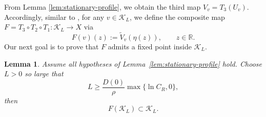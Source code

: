 \documentclass[preprint,sort&compress,final,12pt]{elsarticle}
\newtheorem{lemma}[theorem]{Lemma}
\numberwithin{equation}{section}
\begin{document}
From Lemma \ref{lem:stationary-profile}, we obtain the third map $V_v=T_3(U_v)$. Accordingly, similar to \cite{ChenQi2025}, for any $v\in\mathcal K_L$, we define the composite map $F = T_3\circ T_2\circ T_1:\mathcal K_L\to X$ via
\begin{equation*}
F(v)(z):=\widetilde V_v(\eta(z)),\qquad z\in\mathbb R.
\end{equation*}
Our next goal is to prove that $F$ admits a fixed point inside $\mathcal K_L$.

\begin{lemma}\label{lem:F-invariant}
Assume all hypotheses of Lemma~\ref{lem:stationary-profile} hold. Choose $L>0$ so large that
\begin{equation*}
L\ge \frac{D(0)}{\rho}\max\{\ln C_R,0\},
\end{equation*}
then
\begin{equation}\label{eq:F-invariant}
F(\mathcal K_L)\subset \mathcal K_L.
\end{equation}
\end{lemma}
\end{document}
